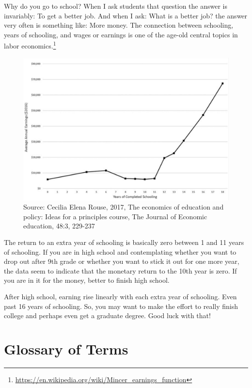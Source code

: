 \documentclass[
]{book}
\begin{document}
Why do you go to school? When I ask students that question the answer is invariably: To get a better job. And when I ask: What is a better job? the answer very often is something like: More money. The connection between schooling, years of schooling, and wages or earnings is one of the age-old central topics in labor economics.\footnote{\url{https://en.wikipedia.org/wiki/Mincer_earnings_function}}

\begin{figure}

{\centering \includegraphics[width=1\linewidth]{img/rationalchoice/fig11} 

}

\caption{Source: Cecilia Elena Rouse, 2017, The economics of education and policy: Ideas for a principles course, The Journal of Economic education, 48:3, 229-237}\label{fig:rationalchoice11}
\end{figure}

The return to an extra year of schooling is basically zero between 1 and 11 years of schooling. If you are in high school and contemplating whether you want to drop out after 9th grade or whether you want to stick it out for one more year, the data seem to indicate that the monetary return to the 10th year is zero. If you are in it for the money, better to finish high school.

After high school, earning rise linearly with each extra year of schooling. Even past 16 years of schooling. So, you may want to make the effort to really finish college and perhaps even get a graduate degree. Good luck with that!

\hypertarget{glossary-of-terms-1}{%
\section{Glossary of Terms}\label{glossary-of-terms-1}}
\end{document}
